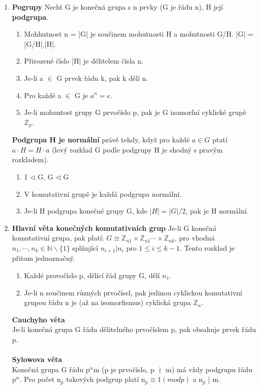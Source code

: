 \documentclass[12pt,a4paper]{article}
\begin{document}
\begin{enumerate}
	\item \textbf{Pogrupy}
		Nechť G je konečná grupa s n prvky (G je řádu n), H její \textbf{podgrupa}.
		\begin{enumerate}
			\item Mohhutnost n = |G| je součinem mohutnosti H a mohutnosti G/H. |G| = |G/H|.|H|.
			\item Přirozené číslo |H| je dělitelem čísla n.
			\item Je-li a $\in$ G prvek řádu k, pak k dělí n.
			\item Pro každé a $\in$ G je $a^n = e$.
			\item Je-li mohuntost grupy G prvočíslo p, pak je G izomorfní cyklické grupě $\mathbb{Z}_p$. 
		\end{enumerate}
	
		\textbf{Podgrupa H je normální} právě tehdy, když pro každé $a \in G$ ptatí $a\cdot H = H\cdot a$ (levý rozklad G podle podgrupy H je shodný s pravým rozkladem).
		\begin{enumerate}
			\item 1 $\lhd$ G, G $\lhd$ G
			\item V komutativní grupě je každá podgrupa normální.
			\item Je-li H podgrupa konečné grupy G, kde $|H|=|G|/2$, pak je H normální.
		\end{enumerate}
	
	\item \textbf{Hlavní věta konečných komutativních grup}
		Je-li G konečná komutativní grupa, pak platí: $G\cong \mathbb{Z}_{n1} \times \mathbb{Z}_{n1}\cdots\times\mathbb{Z}_{nk}$, pro vhodná $n_1,\cdots,n_k\in\mathbb{N}\backslash\{1\}$ splňující $n_{i+1}|n_i$ pro $1 \leq i \leq k-1$. Tento rozklad je přitom jednoznačný.
		\begin{enumerate}
			\item Každé provočíslo p, dělící řád grupy G, dělí $n_1$.
			\item Je-li n součinem různých prvočísel, pak jedinou cyklickou komutativní grupou řádu n je (až na isomorfismus) cyklická grupa $\mathbb{Z}_n$.
		\end{enumerate}
		
		\textbf{Cauchyho věta} \\
		Je-li konečná grupa G řádu dělitelného prvočíslem p, pak obsahuje prvek řádu p.\\ \\
		\textbf{Sylowova věta} \\
		Konečná grupa G řádu p$^\alpha$m (p je prvočíslo, p $\nmid$ m) má vždy podgrupu řádu p$^\alpha$. Pro počet n$_p$ takových podgrup platí n$_p \equiv 1 (mod p)$ a n$_p$ | m. 
		

\end{enumerate}
\end{document}
